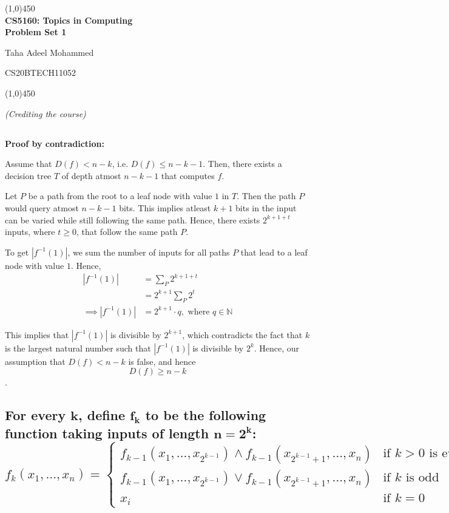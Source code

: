 \documentclass{article}
\renewcommand{\author}{Taha Adeel Mohammed}
\newcommand{\rollnumber}{CS20BTECH11052}
\newcommand{\course}{CS5160: Topics in Computing}
\newcommand{\assignment}{Problem Set 1}
\renewcommand{\maketitle}{
	\begin{center}
		\line(1,0){450} \\
		\vspace*{1ex}
        \Large{\textbf{\course}} \\
        \Large{\textbf{\assignment}} \\
    \end{center}
	\large{\author}
	\begin{flushright}
		\vspace*{-5ex}
		\rollnumber \\
	\end{flushright}
	\begin{center}
		\vspace*{-1ex}
		\line(1,0){450}
	\end{center}
}
\begin{document}
\maketitle

\textit{(Crediting the course)}

\subsection{}

\textbf{Proof by contradiction:}

Assume that $D(f) < n - k$, i.e. $D(f) \leq n - k - 1$. Then, there exists a decision tree $T$ of depth atmost $n - k - 1$ that computes $f$.

\noindent
Let $P$ be a path from the root to a leaf node with value $1$ in $T$. Then the path $P$ would query atmost $n - k - 1$ bits. This implies atleast $k + 1$ bits in the input can be varied while still following the same path. Hence, there exists $2^{k+1+t}$ inputs, where $t \geq 0$, that follow the same path $P$. 

\noindent
To get $|f^{-1}(1)|$, we sum the number of inputs for all paths $P$ that lead to a leaf node with value $1$. Hence, 
\begin{align*}
	|f^{-1}(1)| &= \sum_{P} 2^{k+1+t} \\
	&= 2^{k+1} \sum_{P} 2^t \\
 \implies |f^{-1}(1)| &= 2^{k+1} \cdot q, \text{ where } q \in \mathbb{N}
\end{align*}

\noindent
This implies that $|f^{-1}(1)|$ is divisible by $2^{k+1}$, which contradicts the fact that $k$ is the largest natural number such that $|f^{-1}(1)|$ is divisible by $2^k$. Hence, our assumption that $D(f) < n - k$ is false, and hence $$\boxed{D(f) \geq n - k}$$.
\vspace*{-8mm}
\begin{flushright}
	\qedsymbol{}
\end{flushright}

\subsection{For every $\mathbf{k}$, define $\mathbf{f_k}$ to be the following function taking inputs of length $\mathbf{n = 2^k}$:
$$ f_k(x_1, \ldots, x_n) = \begin{cases}
	f_{k-1}(x_1, \ldots, x_{2^{k-1}}) \land f_{k-1}(x_{2^{k-1}+1}, \ldots, x_n) & \text{if $k > 0$ is even} \\
	f_{k-1}(x_1, \ldots, x_{2^{k-1}}) \lor f_{k-1}(x_{2^{k-1}+1}, \ldots, x_n) & \text{if $k$ is odd} \\
	x_i & \text{if $k = 0$}
\end{cases} $$
}
\end{document}
